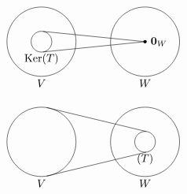\documentclass[a4paper,11pt]{book}
\theoremstyle{definition}
\newcommand{\ve}[1]{\mathbf{#1}}
\DeclareMathOperator{\Ker}{Ker}
\let\Im\relax
\DeclareMathOperator{\Im}{Im} %
\begin{document}
\begin{figure} 
	\begin{minipage}{0.5\linewidth}
		\[
			\begin{tikzpicture}[scale=1.1]
				\draw (0,0) circle (1);
				\draw (0,0) circle (0.3);
				\draw (3,0) circle (1);
				\node at (0, -1.2) {$V$};
				\node at (3, -1.2) {$W$};
				\draw (0.083*0.6, 0.493*0.6) -- (3,0);
				\draw (0.083*0.6, -0.493*0.6) -- (3,0);
				\fill[fill=black] (3,0) circle (0.05);
				\node at (3.4, 0) {$\ve{0}_W$};
				\node at (0, -0.5) {$\Ker(T)$};
			\end{tikzpicture}
		\]
	\end{minipage}
	\begin{minipage}{0.5\linewidth}
		\[
			\begin{tikzpicture}[scale=1.1]
				\draw (0,0) circle (1);
				\draw (3,0) circle (0.3);
				\draw (3,0) circle (1);
				\node at (0, -1.2) {$V$};
				\node at (3, -1.2) {$W$};
				\draw (0.15, 0.987) -- (3.03,0.3);
				\draw (0.15, -0.987) -- (3.03,-0.3);
				\node at (3, -0.5) {$\Im(T)$};
			\end{tikzpicture}
		\]
	\end{minipage}
	\caption{\label{ker_and_im_fig}}
\end{figure}
\end{document}

